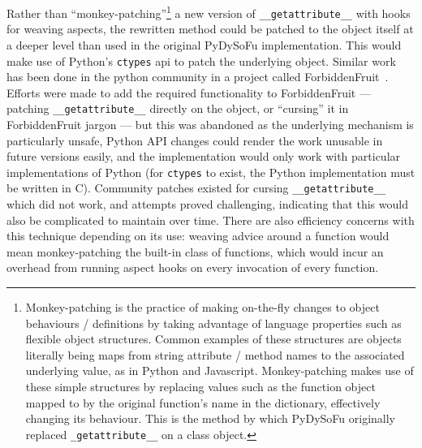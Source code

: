 Rather than ``monkey-patching''\footnote{Monkey-patching is the practice of making on-the-fly changes to object
behaviours / definitions by taking advantage of language properties such as
flexible object structures. Common examples of these structures are objects literally being maps from string
attribute / method names to the associated underlying value, as in Python and Javascript. Monkey-patching
makes use of these simple structures by replacing
values such as the function object mapped to by the original function's name in
the dictionary, effectively changing its behaviour. This is the method by which PyDySoFu originally replaced
\lstinline{_getattribute__} on a class object.} a new version of
\lstinline{__getattribute__} with hooks for weaving aspects, the rewritten
method could be patched to the object itself at a deeper level than used in the
original PyDySoFu implementation. This would make use of Python's
\lstinline{ctypes} api to patch the underlying object. Similar work has been
done in the python community in a project called
ForbiddenFruit~\cite{forbiddenfruit_repo}. Efforts were made to add the required
functionality to ForbiddenFruit --- patching \lstinline{__getattribute__}
directly on the object, or ``cursing'' it in ForbiddenFruit jargon --- but this
was abandoned as the underlying mechanism is particularly unsafe, Python API
changes could render the work unusable in future versions easily, and the
implementation would only work with particular implementations of Python (for
\lstinline{ctypes} to exist, the Python implementation must be written in C).
Community patches existed for cursing \lstinline{__getattribute__} which did not
work, and attempts proved challenging, indicating that this would also be
complicated to maintain over time. There are also efficiency concerns with this
technique depending on its use: weaving advice around a function would mean
monkey-patching the built-in class of functions, which would incur an overhead
from running aspect hooks on every invocation of every function.

